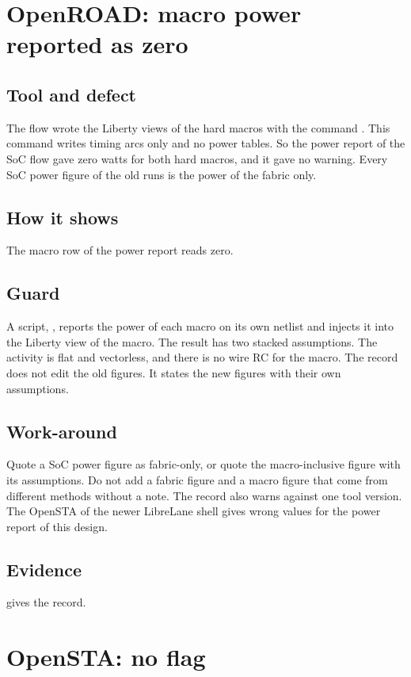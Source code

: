\section{OpenROAD: macro power reported as zero}\label{tm:defect:macro-power-omitted}
\subsection*{Tool and defect}
The flow wrote the Liberty views of the hard macros with the command . This command writes timing arcs only and no power tables. So the power report of the SoC flow gave zero watts for both hard macros, and it gave no warning. Every SoC power figure of the old runs is the power of the fabric only.

\subsection*{How it shows}
The macro row of the power report reads zero.

\subsection*{Guard}
A script, , reports the power of each macro on its own netlist and injects it into the Liberty view of the macro. The result has two stacked assumptions. The activity is flat and vectorless, and there is no wire RC for the macro. The record does not edit the old figures. It states the new figures with their own assumptions.

\subsection*{Work-around}
Quote a SoC power figure as fabric-only, or quote the macro-inclusive figure with its assumptions. Do not add a fabric figure and a macro figure that come from different methods without a note. The record also warns against one tool version. The OpenSTA of the newer LibreLane shell gives wrong values for the power report of this design.

\subsection*{Evidence}
 gives the record.

\section{OpenSTA: no \texorpdfstring{}{-datapath\_only} flag}\label{tm:defect:opensta-datapath-only}
